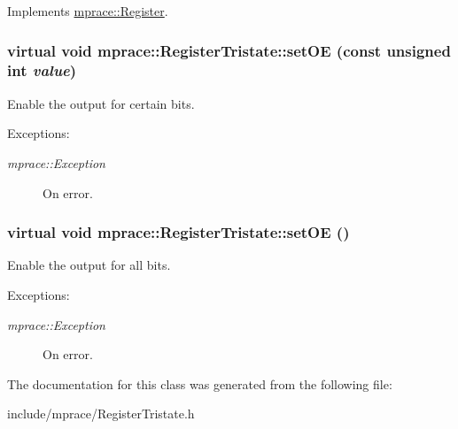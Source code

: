 Implements \hyperlink{classmprace_1_1Register_a1}{mprace::Register}.\hypertarget{classmprace_1_1RegisterTristate_a4}{
\subsubsection[setOE]{\setlength{\rightskip}{0pt plus 5cm}virtual void mprace::Register\-Tristate::set\-OE (const unsigned int {\em value})}}
\label{classmprace_1_1RegisterTristate_a4}


Enable the output for certain bits. 

\begin{Desc}
\item[Exceptions:]
\begin{description}
\item[{\em mprace::Exception}]On error.\end{description}
\end{Desc}
\hypertarget{classmprace_1_1RegisterTristate_a3}{
\subsubsection[setOE]{\setlength{\rightskip}{0pt plus 5cm}virtual void mprace::Register\-Tristate::set\-OE ()}}
\label{classmprace_1_1RegisterTristate_a3}


Enable the output for all bits. 

\begin{Desc}
\item[Exceptions:]
\begin{description}
\item[{\em mprace::Exception}]On error.\end{description}
\end{Desc}


The documentation for this class was generated from the following file:\begin{CompactItemize}
\item 
include/mprace/Register\-Tristate.h\end{CompactItemize}
